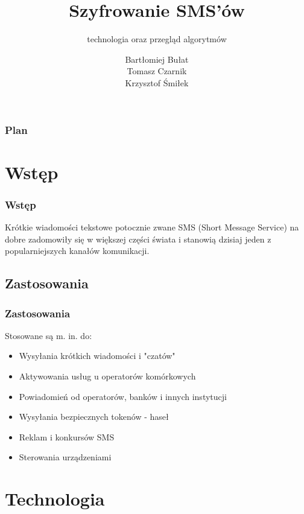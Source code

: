 \documentclass[xcolor=table]{beamer}
\title{Szyfrowanie SMS’ów}
\subtitle{technologia oraz przegląd algorytmów}
\author{Bartłomiej Bułat\\
Tomasz Czarnik\\
Krzysztof Śmiłek\\}
\begin{document}
\begin{frame}
  \titlepage
\end{frame}


\begin{frame}
  \frametitle{Plan}
  \tableofcontents
\end{frame}


\section{Wstęp}

\begin{frame}
  \frametitle{Wstęp}
 Krótkie wiadomości tekstowe potocznie zwane SMS (Short Message Service) na dobre zadomowiły się w większej części świata i stanowią dzisiaj jeden z popularniejszych kanałów komunikacji. 
\end{frame}

\subsection{Zastosowania}
\begin{frame}
  \frametitle{Zastosowania}

Stosowane są m. in. do:
\begin{itemize}
\item Wysyłania krótkich wiadomości i "czatów"
\item Aktywowania usług u operatorów komórkowych
\item Powiadomień od operatorów, banków i innych instytucji
\item Wysyłania bezpiecznych tokenów - haseł
\item Reklam i konkursów SMS
\item Sterowania urządzeniami 
\end{itemize}
   
\end{frame}

\section{Technologia}

\end{document}
